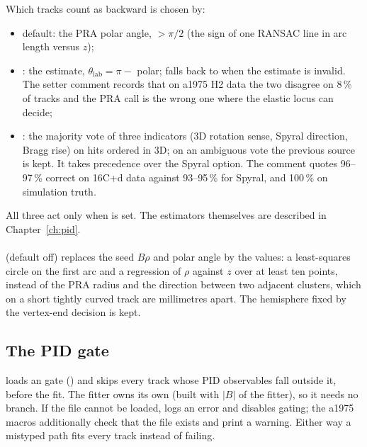 Which tracks count as backward is chosen by:
\begin{itemize}
\item default: the PRA polar angle,  $>\pi/2$ (the sign of one RANSAC line in arc length versus
  $z$);
\item {}: the  estimate, $\theta_\mathrm{lab}=\pi-$ polar; falls
  back to  when the estimate is invalid. The setter comment records that on a1975 H2 data the two
  disagree on 8\,\% of tracks and the PRA call is the wrong one where the elastic locus can decide;
\item {}: the  majority vote of three indicators (3D rotation sense,
  Spyral direction, Bragg rise) on hits ordered in 3D; on an ambiguous vote the previous source is kept. It takes
  precedence over the Spyral option. The comment quotes 96--97\,\% correct on 16C+d data against 93--95\,\% for
  Spyral, and 100\,\% on simulation truth.
\end{itemize}
All three act only when  is set. The estimators themselves are described in
Chapter~\ref{ch:pid}.

\paragraph{} (default off) replaces the seed $B\rho$ and polar angle by the
 values: a least-squares circle on the first arc and a regression of $\rho$ against $z$ over at
least ten points, instead of the PRA radius and the direction between two adjacent clusters, which on a short tightly
curved track are millimetres apart. The hemisphere fixed by the vertex-end decision is kept.

\subsection{The PID gate}
\label{sec:gf-pid}

 loads an  gate () and skips every track
whose PID observables fall outside it, before the fit. The fitter owns its own  (built with
$|B|$ of the fitter), so it needs no  branch. If the file cannot be loaded,  logs an error
and disables gating; the a1975 macros additionally check that the file exists and print a warning. Either way a mistyped
path fits every track instead of failing.

